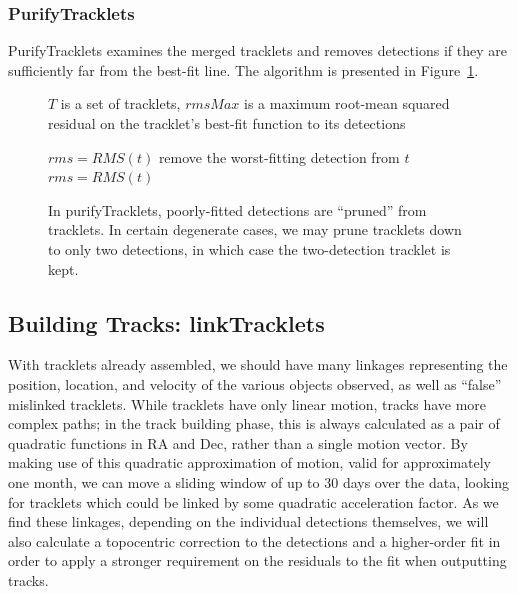 \subsubsection{PurifyTracklets}
PurifyTracklets examines the merged tracklets and removes detections
if they are sufficiently far from the best-fit line. The algorithm is
presented in Figure~\ref{purifyTrackletsAlgorithm}. 

\begin{figure}[ht]
\hrulefill
\begin{algorithmic}[5]
  \Require $T$ is a set of tracklets, $rmsMax$ is a maximum root-mean
  squared residual on the tracklet's best-fit function to its
  detections

    \State $rms = RMS(t)$
      \State remove the worst-fitting detection from $t$
      \State $rms = RMS(t)$
    \EndWhile
  \EndFor
\end{algorithmic}
\hrulefill
\caption[purifyTracklets pseudocode.]{In purifyTracklets, poorly-fitted detections are ``pruned''
  from tracklets. In certain degenerate cases, we may prune tracklets
  down to only two detections, in which case the two-detection
  tracklet is kept.}
\label{purifyTrackletsAlgorithm}
\end{figure}







\subsection{Building Tracks: linkTracklets}

With tracklets already assembled, we should have many linkages
representing the position, location, and velocity of the various
objects observed, as well as ``false'' mislinked tracklets.  While
tracklets have only linear motion, tracks have more complex paths; in the
track building phase, this is always calculated as a pair of quadratic
functions in RA and Dec, rather than a single motion vector.  By
making use of this quadratic approximation of motion, valid for
approximately one month, we can move a sliding window of up to 30 days
over the data, looking for tracklets which could be linked by some
quadratic acceleration factor.  As we find these linkages, depending
on the individual detections themselves, we will also calculate a topocentric correction to the
detections and a higher-order fit in order to apply a stronger
requirement on the residuals to the fit when outputting tracks. 

